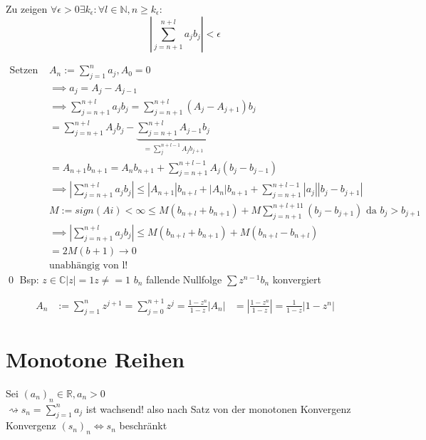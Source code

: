 \documentclass[fleqn]{scrbook}
\newcommand{\R}{\mathbb{R}}
\newcommand{\N}{\mathbb{N}}
\renewenvironment{proof}{{\bfseries Beweis }}{\qed}
\begin{document}
\begin{proof}
 Zu zeigen $\forall \epsilon > 0 \exists k_\epsilon: \forall l \in \N, n \ge k_\epsilon:$
 $$| \sum_{j=n+1}^{n+l} a_j b_j | < \epsilon$$
 
 \begin{equation}
  \begin{split}
    \text{Setzen } & A_n := \sum_{j=1}^{n}a_j, A_0 = 0 \\
    & \implies a_j = A_j - A_{j-1} \\
    & \implies \sum_{j=n+1}^{n+l}  a_j b_j = \sum_{j=n+1}^{n+l} (A_j - A_{j+1}) b_j \\
    & = \sum_{j=n+1}^{n+l}  A_j b_j - \underbrace{\sum_{j=n+1}^{n+l}  A_{j-1} b_j}_{= \sum_j^{n+l-1} A_j b_{j+1}} \\
    & = A_{n+1} b_{n+1} = A_n b_{n+1} + \sum_{j=n+1}^{n+l-1} A_j (b_j - b_{j-1}) \\
    & \implies | \sum_{j=n+1}^{n+l}  a_j b_j | \le | A_{n+1} | b_{n+l} + |A_n| b_{n+1} + \sum_{j=n+1}^{n+l-1} |a_j| |b_j - b_{j+1}|  \\
    & M := sign(Ai) < \infty \le M (b_{n+l} + b_{n+1}) + M \sum_{j=n+1}^{n+l+11} (b_j - b_{j+1})  \text{  da  } b_j > b_{j+1} \\
    & \implies |\sum_{j=n+1}^{n+l} a_j b_j| \le M(b_{n+l} + b_{n+1}) + M (b_{n+l} - b_{n+l}) \\
    & = 2 M(b+1) \to 0 \\
    & \text{unabhängig von l!}
  \end{split}
 \end{equation}
\end{proof}
Bsp: $z \in \mathbb{C} |z| = 1 z \neq = 1$
$b_n $ fallende Nullfolge
$\sum z^{n-1} b_n$ konvergiert

\begin{equation}
 \begin{split}
  A_n & := \sum_{j=1}^{n} z^{j+1} = \sum_{j=0}^{n+1}z^j = \frac{1-z^n}{1-z}
  |A_n| & = |\frac{1-z^n}{1-z}| = \frac{1}{1-z} | 1-z^n|
 \end{split}
\end{equation}

\section{Monotone Reihen}
Sei $(a_n)_n \in \R, a_n > 0$ \\
$\rightsquigarrow s_n = \sum_{j=1}^n a_j$ ist wachsend!
also nach Satz von der monotonen Konvergenz
Konvergenz $(s_n)_n \Leftrightarrow s_n$ beschränkt
\end{document}
